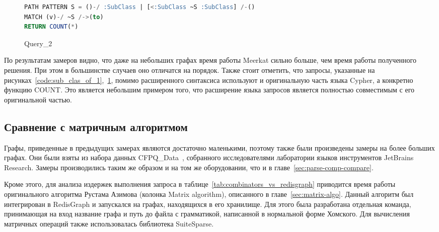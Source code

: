 \begin{figure}[h!]
\begin{adjustbox}{max width=\textwidth}
\begin{lstlisting}[language=sql]
PATH PATTERN S = ()-/ :SubClass | [<:SubClass ~S :SubClass] /-()
MATCH (v)-/ ~S /->(to)
RETURN COUNT(*)
\end{lstlisting}
\end{adjustbox}
\caption{Query\_2}
\label{code:sub_clas_of_2}
\end{figure}

По результатам замеров видно, что даже на небольших графах время работы Meerkat сильно больше, чем время работы полученного решения. При этом в большинстве случаев оно отличатся на порядок. Также стоит отметить, что запросы, указанные на рисунках~\ref{code:sub_clas_of_1},~\ref{code:sub_clas_of_2}, помимо расширенного синтаксиса используют и оригинальную часть языка Cyp\-her, а конкретно функцию COUNT. Это является небольшим примером того, что расширение языка запросов является полностью совместимым с его оригинальной частью.


\subsection{Сравнение с матричным алгоритмом}
Графы, приведенные в предыдущих замерах являются достаточно маленькими, поэтому также были произведены замеры на более больших графах. Они были взяты из набора данных CFPQ\_Data~\cite{cfpq-data}, собранного исследователями лаборатории языков инструментов JetBrains Research. Замеры производились таким же образом и на том же оборудовании, что и в главе~\ref{sec:parse-comp-compare}.


Кроме этого, для анализа издержек выполнения запроса в таблице~\ref{tab:combinators_vs_redisgraph} приводится время работы оригинального алгоритма Рустама Азимова (колонка Matrix algorithm), описанного в главе~\ref{sec:matrix-algo}. Данный алгоритм был интегрирован в RedisGraph и запускался на графах, находящихся в его хранилище. Для этого была разработана отдельная команда, принимающая на вход название графа и путь до файла с грамматикой, написанной в нормальной форме Хомского. Для вычисления матричных операций также использовалась библиотека SuiteSparse.


